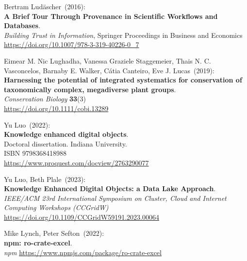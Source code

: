 \begin{thebibliography}{9}
Bertram Ludäscher~(2016): \\
\textbf{A Brief Tour Through Provenance in Scientific Workflows and Databases}.\\
\emph{Building Trust in Information}, Springer Proceedings in Business and Economics \\
\url{https://doi.org/10.1007/978-3-319-40226-0_7}

Eimear M. Nic Lughadha, Vanessa Graziele Staggemeier, Thais N. C. Vasconcelos, Barnaby E. Walker, Cátia Canteiro, Eve J. Lucas~(2019): \\
\textbf{Harnessing the potential of integrated systematics for conservation of taxonomically complex, megadiverse plant groups}.\\ 
\emph{Conservation Biology} \textbf{33}(3)\\
\url{https://doi.org/10.1111/cobi.13289}

Yu Luo~(2022): \\
\textbf{Knowledge enhanced digital objects}.\\
Doctoral dissertation. Indiana University.\\
ISBN 9798368418988 \\
\url{https://www.proquest.com/docview/2763290077}

Yu Luo, Beth Plale~(2023): \\
\textbf{Knowledge Enhanced Digital Objects: a Data Lake Approach}.\\
\emph{IEEE/ACM 23rd International Symposium on Cluster, Cloud and Internet Computing Workshops (CCGridW)}\\
\url{https://doi.org/10.1109/CCGridW59191.2023.00064}

Mike Lynch, Peter Sefton~(2022): \\
\textbf{npm: ro-crate-excel}.\\
\emph{npm} \url{https://www.npmjs.com/package/ro-crate-excel}



\end{thebibliography}

